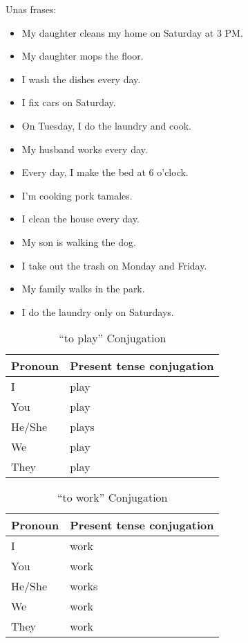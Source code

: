 Unas frases:
\begin{itemize}
	\item My daughter cleans my home on Saturday at 3 PM.
	\item My daughter mops the floor.
	\item I wash the dishes every day.
	\item I fix cars on Saturday.
	\item On Tuesday, I do the laundry and cook.
	\item My husband works every day.
	\item Every day, I make the bed at 6 o'clock.
	\item I'm cooking pork tamales.
	\item I clean the house every day.
	\item My son is walking the dog.
	\item I take out the trash on Monday and Friday.
	\item My family walks in the park.
	\item I do the laundry only on Saturdays.
\end{itemize}


\begin{table}[H]
	\centering
	\begin{tabular}{ll}
	\toprule
		\textbf{Pronoun} & \textbf{Present tense conjugation} \\
	\midrule
		I & play \\
		You & play \\
		He/She & plays \\
		We & play \\
		They & play \\
	\bottomrule
	\end{tabular}
	\caption{``to play'' Conjugation}
\end{table}

\begin{table}[H]
	\centering
	\begin{tabular}{ll}
	\toprule
		\textbf{Pronoun} & \textbf{Present tense conjugation} \\
	\midrule
		I & work \\
		You & work \\
		He/She & works \\
		We & work \\
		They & work \\
	\bottomrule
	\end{tabular}
	\caption{``to work'' Conjugation}
\end{table}
